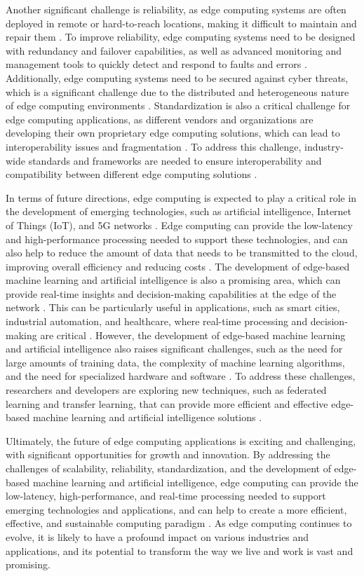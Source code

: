 \documentclass[11pt]{article}
\begin{document}
Another significant challenge is reliability, as edge computing systems are often deployed in remote or hard-to-reach locations, making it difficult to maintain and repair them \cite{ref18}. To improve reliability, edge computing systems need to be designed with redundancy and failover capabilities, as well as advanced monitoring and management tools to quickly detect and respond to faults and errors \cite{ref61}. Additionally, edge computing systems need to be secured against cyber threats, which is a significant challenge due to the distributed and heterogeneous nature of edge computing environments \cite{ref16}. Standardization is also a critical challenge for edge computing applications, as different vendors and organizations are developing their own proprietary edge computing solutions, which can lead to interoperability issues and fragmentation \cite{ref1}. To address this challenge, industry-wide standards and frameworks are needed to ensure interoperability and compatibility between different edge computing solutions \cite{ref62}.

In terms of future directions, edge computing is expected to play a critical role in the development of emerging technologies, such as artificial intelligence, Internet of Things (IoT), and 5G networks \cite{ref63}. Edge computing can provide the low-latency and high-performance processing needed to support these technologies, and can also help to reduce the amount of data that needs to be transmitted to the cloud, improving overall efficiency and reducing costs \cite{ref24}. The development of edge-based machine learning and artificial intelligence is also a promising area, which can provide real-time insights and decision-making capabilities at the edge of the network \cite{ref43}. This can be particularly useful in applications, such as smart cities, industrial automation, and healthcare, where real-time processing and decision-making are critical \cite{ref64}. However, the development of edge-based machine learning and artificial intelligence also raises significant challenges, such as the need for large amounts of training data, the complexity of machine learning algorithms, and the need for specialized hardware and software \cite{ref6}. To address these challenges, researchers and developers are exploring new techniques, such as federated learning and transfer learning, that can provide more efficient and effective edge-based machine learning and artificial intelligence solutions \cite{ref36}.

Ultimately, the future of edge computing applications is exciting and challenging, with significant opportunities for growth and innovation. By addressing the challenges of scalability, reliability, standardization, and the development of edge-based machine learning and artificial intelligence, edge computing can provide the low-latency, high-performance, and real-time processing needed to support emerging technologies and applications, and can help to create a more efficient, effective, and sustainable computing paradigm \cite{ref65}. As edge computing continues to evolve, it is likely to have a profound impact on various industries and applications, and its potential to transform the way we live and work is vast and promising.
\end{document}
